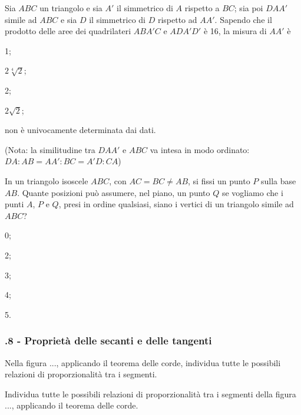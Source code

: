 \begin{esercizio}
\label{ese:6.97}
Sia $ABC$ un triangolo e sia $A'$ il simmetrico di $A$ rispetto a $BC$; sia poi $DAA'$ simile ad $ABC$ e sia $D$ il simmetrico di $D$ rispetto ad $AA'$. Sapendo che il prodotto delle aree dei quadrilateri $ABA'C$ e $ADA'D'$ è 16, la misura di $AA'$ è
\begin{enumeratea}
\item 1;
\item $2\sqrt[4]{2}$;
\item 2;
\item $2\sqrt{2}$;
\item non è univocamente determinata dai dati.
\end{enumeratea}
(Nota: la similitudine tra $DAA'$ e $ABC$ va intesa in modo ordinato: $DA : AB = AA':BC=A'D:CA$)
\end{esercizio}

\begin{esercizio}
\label{ese:6.98}
In un triangolo isoscele $ABC$, con $AC = BC \neq AB$, si fissi un punto $P$ sulla base $AB$. Quante posizioni può assumere, nel piano, un punto $Q$ se vogliamo che i punti $A$, $P$ e $Q$, presi in ordine qualsiasi, siano i vertici di un triangolo simile ad $ABC$?
\begin{multicols}{5}
\begin{enumeratea}
\item 0;
\item 2;
\item 3;
\item 4;
\item 5.
\end{enumeratea}
\end{multicols}
\end{esercizio}
 
\subsubsection*{\thechapter.8 - Proprietà delle secanti e delle tangenti}

\begin{esercizio}
\label{ese:6.99}
Nella figura ..., applicando il teorema delle corde, individua tutte le possibili relazioni di proporzionalità tra i segmenti.
\end{esercizio}

\begin{esercizio}
\label{ese:6.100}
Individua tutte le possibili relazioni di proporzionalità tra i segmenti della figura ..., applicando il teorema delle corde.
\end{esercizio}


